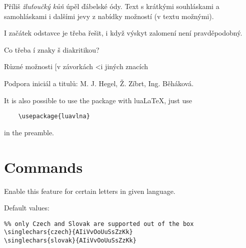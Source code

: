 \documentclass[12pt]{ltxdoc}
\newenvironment{mycode}{
	\medskip%
	\parindent=0pt%
}{\medskip}
\begin{document}

\noindent
\begin{minipage}{3in}
\preventsingledebugon
{}
Příliš \textit{žluťoučký kůň} úpěl ďábelské ódy. 
Text s krátkými souhláskami a samohláskami i dalšími jevy z nabídky možností (v textu možnými). 

I začátek odstavce je třeba řešit, i když výskyt zalomení není pravděpodobný.

Co třeba í znaky š diakritikou?

Různé možnosti [v závorkách \textless i jiných znacích

Podpora iniciál a titulů: M. J. Hegel, Ž. Zíbrt, Ing. Běháková.

\preventsingledebugoff
\end{minipage}

\bigskip
It is also possible to use the package with lua\LaTeX, just use

\begin{verbatim}
	\usepackage{luavlna}
\end{verbatim}

in the preamble.

\section{Commands}

\begin{mycode}
\cmd{\singlechars} 
\end{mycode}

Enable this feature for certain letters in given language. 

Default values:

\begin{mycode}
\begin{verbatim}
%% only Czech and Slovak are supported out of the box
\singlechars{czech}{AIiVvOoUuSsZzKk}
\singlechars{slovak}{AIiVvOoUuSsZzKk}
\end{verbatim}
\end{mycode}

\end{document}
